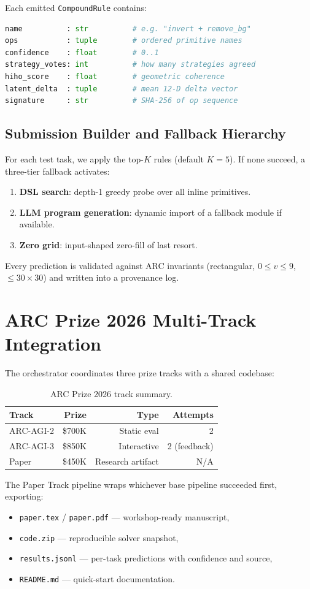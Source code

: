 \documentclass[11pt,a4paper]{article}
\begin{document}
Each emitted \texttt{CompoundRule} contains:
\begin{lstlisting}[language=Python]
name          : str          # e.g. "invert + remove_bg"
ops           : tuple        # ordered primitive names
confidence    : float        # 0..1
strategy_votes: int          # how many strategies agreed
hiho_score    : float        # geometric coherence
latent_delta  : tuple        # mean 12-D delta vector
signature     : str          # SHA-256 of op sequence
\end{lstlisting}

\subsection{Submission Builder and Fallback Hierarchy}
For each test task, we apply the top-$K$ rules (default $K=5$). If none succeed, a three-tier fallback activates:
\begin{enumerate}
    \item \textbf{DSL search}: depth-1 greedy probe over all inline primitives.
    \item \textbf{LLM program generation}: dynamic import of a fallback module if available.
    \item \textbf{Zero grid}: input-shaped zero-fill of last resort.
\end{enumerate}
Every prediction is validated against ARC invariants (rectangular, $0\le v\le9$, $\le30\times30$) and written into a provenance log.

\section{ARC Prize 2026 Multi-Track Integration}
The orchestrator coordinates three prize tracks with a shared codebase:
\begin{table}[h]
\centering
\begin{tabular}{@{}lrrr@{}}
\toprule
Track & Prize & Type & Attempts \\
\midrule
ARC-AGI-2 & \$700K & Static eval & 2 \\
ARC-AGI-3 & \$850K & Interactive & 2 (feedback) \\
Paper      & \$450K & Research artifact & N/A \\
\bottomrule
\end{tabular}
\caption{ARC Prize 2026 track summary.}
\end{table}

The Paper Track pipeline wraps whichever base pipeline succeeded first, exporting:
\begin{itemize}
    \item \texttt{paper.tex} / \texttt{paper.pdf} --- workshop-ready manuscript,
    \item \texttt{code.zip} --- reproducible solver snapshot,
    \item \texttt{results.jsonl} --- per-task predictions with confidence and source,
    \item \texttt{README.md} --- quick-start documentation.
\end{itemize}
\end{document}

